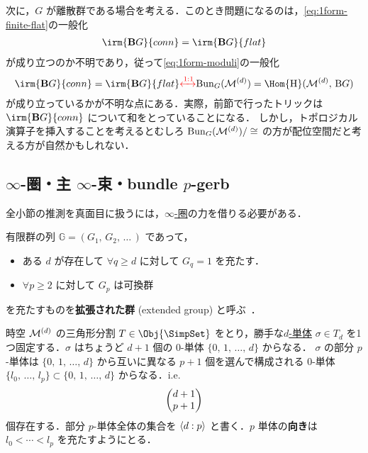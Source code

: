 \documentclass[TQFT_main]{subfiles}
\begin{document}
次に，$G$ が離散群である場合を考える．このとき問題になるのは，\eqref{eq:1form-finite-flat}の一般化
\begin{align}
    \irm{\bm{\mathrm{B}}G}{conn} = \irm{\bm{\mathrm{B}}G}{flat} 
\end{align}
が成り立つのか不明であり，従って\eqref{eq:1form-moduli}の一般化
\begin{align}
    \irm{\bm{\mathrm{B}}G}{conn} = \irm{\bm{\mathrm{B}}G}{flat} \textcolor{red}{\xleftrightarrow{1:1}} \mathrm{Bun}_G (\mfdcal{M}{d}) = \Hom{\mathrm{\bm{H}}} (\mfdcal{M}{d},\, \mathrm{\bm{B}}G)
\end{align}
が成り立っているかが不明な点にある．実際，前節で行ったトリックは $\irm{\bm{\mathrm{B}}G}{conn}$ について和をとっていることになる．
しかし，トポロジカル演算子を挿入することを考えるとむしろ $\mathrm{Bun}_G (\mathcal{M}^{(d)})/\cong$ の方が配位空間だと考える方が自然かもしれない．

\subsection{$\infty$-圏・主 $\infty$-束・bundle $p$-gerb}

全小節の推測を真面目に扱うには，\hyperref[def:infinity-1]{$\infty$-圏}の力を借りる必要がある．

\begin{mydef}[label=def:extGrp]{}
    有限群の列 $\mathbb{G} = (G_1,\, G_2,\, \dots \,)$ であって，
    \begin{itemize}
        \item ある $d$ が存在して $\forall q \ge d$ に対して $G_q = 1$ を充たす．
        \item $\forall p \ge 2$ に対して $G_p$ は可換群
    \end{itemize}
    を充たすものを\textbf{拡張された群} (extended group) と呼ぶ~\cite{SChen2024anomaly}．
\end{mydef}

時空 $\mathcal{M}^{(d)}$ の三角形分割 $T \in \Obj{\SimpSet}$ をとり，勝手な\hyperref[def:SimpSet]{$d$-単体} $\sigma \in T_d$ を1つ固定する．$\sigma$ はちょうど $d+1$ 個の $0$-単体 $\{0,\, 1,\, \dots,\, d\}$ からなる．
$\sigma$ の部分 $p$-単体は $\{0,\, 1,\, \dots,\, d\}$ から互いに異なる $p+1$ 個を選んで構成される $0$-単体 $\{l_0,\, \dots,\, l_p\} \subset \{0,\, 1,\, \dots,\, d\}$ からなる．i.e.
\begin{align}
    \mqty(d+1 \\  p+1)
\end{align}
個存在する．部分 $p$-単体全体の集合を $\expval{d:p}$ と書く．$p$ 単体の\textbf{向き}は $l_0 < \cdots < l_p$ を充たすようにとる．
\end{document}
